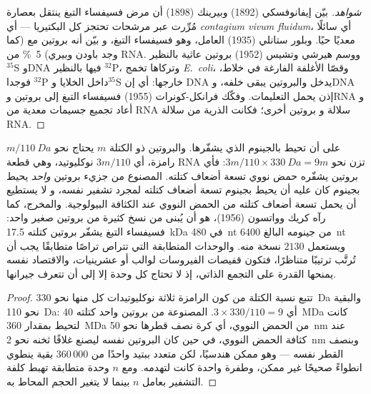 \begin{proof}[شواهد]
بيّن إيفانوفسكي (1892) وبيرينك (1898) أن مرض فسيفساء
التبغ ينتقل بعصارة مُرِّرت عبر مرشحات تحتجز كل
البكتيريا --- أي \emph{contagium vivum fluidum}، أي سائلًا معديًا
حيًا. وبلور ستانلي (1935) العامل، وهو  فسيفساء التبغ، و
بيّن أنه بروتين مع (كما وجد باودن وبيري) \qty{5}{\%}
من RNA. ووسم هيرشي وتشيس (1952) بروتين عاثية
بالنظير $^{35}$S وDNA فيها بالنظير $^{32}$P، وتركاها تخمج \emph{E.~coli}،
وقصّا الأغلفة الفارغة في خلاط، فوجدا $^{32}$P داخل
الخلايا و$^{35}$S خارجها: أي إن DNA يدخل والبروتين
يبقى خلفه، وDNA إذن يحمل التعليمات. وفكّك فرانكل-كونرات
(1955)  فسيفساء التبغ إلى بروتين وRNA و
أعاد تجميع جسيمات معدية من RNA سلالة و
بروتين أخرى؛ فكانت الذرية من سلالة RNA.
\end{proof}

\begin{proposition}\label{prop:b3:virology:economy}
على  أن تحيط بالجينوم الذي يشفّرها. والبروتين ذو الكتلة
$m$ يحتاج نحو $m/\qty{110}{Da}$ رامزة، أي $3m/110$ نوكليوتيد،
وهي قطعة RNA تزن نحو $3m/110\times\qty{330}{Da} = 9m$: فأي
بروتين يشفّره حمض نووي تسعة أضعاف كتلته. 
المصنوع من جزيء بروتين \emph{واحد} يحيط بجينوم كان
عليه أن يحيط بجينوم تسعة أضعاف كتلته لمجرد تشفير نفسه، و
 لا يستطيع أن يحمل تسعة أضعاف كتلته من الحمض النووي عند
الكثافة البيولوجية. والمخرج، كما رآه كريك وواتسون (1956)، هو أن
يُبنى  من نسخ كثيرة من بروتين صغير واحد:  فسيفساء
التبغ يشفّر بروتين  كتلته \qty{17.5}{kDa} في \qty{480}{nt} من
جينومه البالغ \qty{6400}{nt} ويستعمل $2130$ نسخة منه. والوحدات المتطابقة
التي تتراص تراصًا متطابقًا يجب أن تُرتَّب ترتيبًا متناظرًا، فتكون قفيصات الفيروسات
لوالب أو عشرينيات، والاقتصاد نفسه يمنحها
القدرة على التجمع الذاتي، إذ لا تحتاج كل وحدة إلا إلى أن تتعرف
جيرانها.
\end{proposition}
\begin{proof}
تتبع نسبة الكتلة من كون الرامزة ثلاثة نوكليوتيدات كل منها نحو
\qty{330}{Da} والبقية نحو \qty{110}{Da}: أي $3\times 330/110 =
9$.  المصنوعة من بروتين واحد كتلته \qty{40}{MDa} كانت لتحيط بمقدار \qty{360}{MDa}
من الحمض النووي، أي كرة نصف قطرها نحو \qty{50}{nm} عند كثافة
الحمض النووي، في حين كان البروتين نفسه ليصنع غلافًا ثخنه نحو
\qty{2}{nm} وبنصف القطر نفسه --- وهو ممكن هندسيًا،
لكن متعدد ببتيد واحدًا من $360\,000$ بقية ينطوي انطواءً صحيحًا
غير ممكن، وطفرة واحدة كانت لتهدمه. ومع $n$ وحدة متطابقة تهبط
كلفة التشفير بعامل $n$ بينما لا يتغير الحجم المحاط به.
\end{proof}

